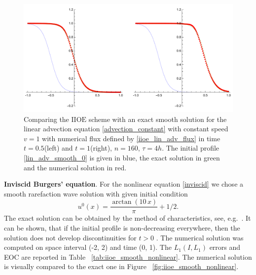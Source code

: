 \documentclass[../include.tex]{subfiles}
\begin{document}
\begin{figure}[H]
	\centering
	\includegraphics[width=\textwidth]{figures/advection_basic_160c4}
	\caption{Comparing the $\mathrm{IIOE}$ scheme with an exact smooth solution for the linear advection equation \eqref{advection_constant} with constant speed $ v = 1 $ with numerical flux defined by \eqref{iioe_lin_adv_flux} in time $ t=0.5 $(left) and $ t=1 $(right), $ n=160 $, $ \tau=4h $. The initial profile \eqref{lin_adv_smooth_0} is given in blue, the exact solution in green and the numerical solution in red.}
	\label{fig:basic_iioe_advection}
\end{figure}
\textbf{Inviscid Burgers' equation}.  For the nonlinear equation \eqref{inviscid} we chose a smooth rarefaction wave solution with given initial condition
\begin{equation}
	\label{inviscid_smooth_init}
	u^0(x) = \frac{\arctan (10\,x) }{\pi} + 1/2.
\end{equation}
The exact solution can be obtained by the method of characteristics, see, e.g.\ \cite{olv, lev, whitham}. It can be shown, that if the initial profile is non-decreasing everywhere, then the solution does not develop discontinuities for $ t>0 $ \cite{olv, whitham}. The numerical solution was computed on space interval (-2, 2) and time (0, 1). The $ L_1(I, L_1) $ errors and EOC are reported in Table ~\ref{tab:iioe_smooth_nonlinear}. The numerical solution is visually compared to the exact one in Figure ~\ref{fig:iioe_smooth_nonlinear}.
\end{document}
